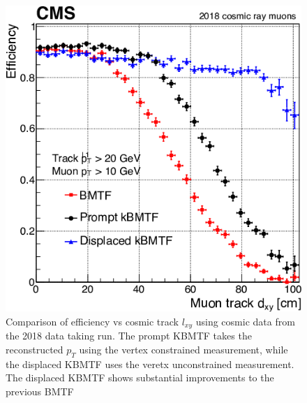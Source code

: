 \begin{figure}[htbp!]
	\centering
	\includegraphics[width=0.55\linewidth]{figs/04_muons/effVsDxy_kmtf.png}
	\caption[Comparison of efficiency vs cosmic track $l_{xy}$ using cosmic data from the 2018 data taking run. The prompt KBMTF takes the reconstructed $p_{T}$ using the vertex constrained measurement, while the displaced KBMTF uses the veretx unconstrained measurement. The displaced KBMTF shows substantial improvements to the previous BMTF~\cite{cmscollaboration2023development}]
	{Comparison of efficiency vs cosmic track $l_{xy}$ using cosmic data from the 2018 data taking run. The prompt KBMTF takes the reconstructed $p_{T}$ using the vertex constrained measurement, while the displaced KBMTF uses the veretx unconstrained measurement. The displaced KBMTF shows substantial improvements to the previous BMTF~\cite{cmscollaboration2023development}}
	\label{fig:effVsDxy_kmtf}
\end{figure}